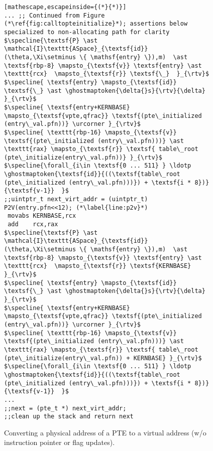 \begin{figure}\footnotesize
\begin{lstlisting}[mathescape,escapeinside={(*}{*)}]
... ;; Continued from Figure (*\ref{fig:calltopteinitialize}*); assertions below specialized to non-allocating path for clarity
$\specline{\textsf{P} \ast \mathcal{I}\texttt{ASpace}_{\textsf{id}}(\theta,\Xi\setminus \{ \mathsf{entry} \}),m)  \ast \textsf{rbp-8} \mapsto_{\textsf{v}} \textsf{entry} \ast \texttt{rcx}  \mapsto_{\textsf{r}} \textsf{\_}  }_{\rtv}$
$\specline{ \textsf{entry} \mapsto_{\textsf{id}} \textsf{\_} \ast \ghostmaptoken{\delta{}s}{\rtv}{\delta}  }_{\rtv}$
$\specline{ \textsf{entry+KERNBASE} \mapsto_{\textsf{vpte,qfrac}} \textsf{(pte\_initialized (entry\_val.pfn))} \urcorner }_{\rtv}$
$\specline{ \texttt{rbp-16} \mapsto_{\textsf{v}} \textsf{(pte\_initialized (entry\_val.pfn)))} \ast \texttt{rax} \mapsto_{\textsf{r}} \textsf{ table\_root (pte\_initialize(entry\_val.pfn))} }_{\rtv}$
$\specline{\forall_{i\in \textsf{0 ... 511} } \ldotp  \ghostmaptoken{\textsf{id}}{((\textsf{table\_root (pte\_initialized (entry\_val.pfn)))}) + \textsf{i * 8})}{\textsf{v-1}}  }$
;;uintptr_t next_virt_addr = (uintptr_t) P2V(entry.pfn<<12); (*\label{line:p2v}*) 
 movabs KERNBASE,rcx
 add    rcx,rax
$\specline{\textsf{P} \ast \mathcal{I}\texttt{ASpace}_{\textsf{id}}(\theta,\Xi\setminus \{ \mathsf{entry} \}),m)  \ast \textsf{rbp-8} \mapsto_{\textsf{v}} \textsf{entry} \ast \texttt{rcx}  \mapsto_{\textsf{r}} \textsf{KERNBASE} }_{\rtv}$
$\specline{ \textsf{entry} \mapsto_{\textsf{id}} \textsf{\_} \ast \ghostmaptoken{\delta{}s}{\rtv}{\delta}  }_{\rtv}$
$\specline{ \textsf{entry+KERNBASE} \mapsto_{\textsf{vpte,qfrac}} \textsf{(pte\_initialized (entry\_val.pfn))} \urcorner }_{\rtv}$
$\specline{ \texttt{rbp-16} \mapsto_{\textsf{v}} \textsf{(pte\_initialized (entry\_val.pfn)))} \ast \texttt{rax} \mapsto_{\textsf{r}} \textsf{ table\_root (pte\_initialize(entry\_val.pfn)) + KERNBASE} }_{\rtv}$
$\specline{\forall_{i\in \textsf{0 ... 511} } \ldotp  \ghostmaptoken{\textsf{id}}{((\textsf{table\_root (pte\_initialized (entry\_val.pfn)))}) + \textsf{i * 8})}{\textsf{v-1}}  }$
...
;;next = (pte_t *) next_virt_addr;
;;clean up the stack and return next
\end{lstlisting}
\vspace{-1em}
\caption{Converting a physical address of a PTE to a virtual address (w/o instruction pointer or flag updates).
}
\label{fig:p2v}
\end{figure}
